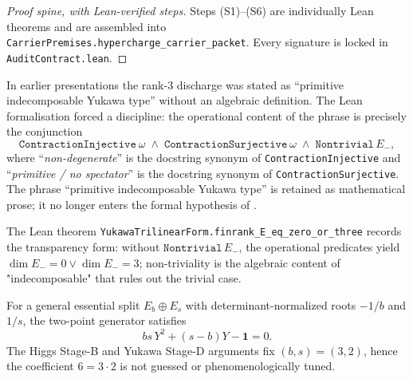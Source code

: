 \begin{proof}[Proof spine, with Lean-verified steps]
Steps (S1)--(S6) are individually Lean theorems and are
assembled into \texttt{CarrierPremises.hypercharge\_carrier\_packet}.
Every signature is locked in
\texttt{AuditContract.lean}.\qedhere
\end{proof}

\begin{remark}
\label{rem:primitive-yukawa-naming}
In earlier presentations the rank-$3$ discharge was stated as
``primitive indecomposable Yukawa type'' without an algebraic
definition. The Lean formalisation forced a discipline: the
operational content of the phrase is precisely the conjunction
\[
\texttt{ContractionInjective}\ \omega
\;\wedge\;
\texttt{ContractionSurjective}\ \omega
\;\wedge\;
\texttt{Nontrivial}\,E_-,
\]
where ``\emph{non-degenerate}'' is the docstring synonym of
\texttt{ContractionInjective} and ``\emph{primitive / no
spectator}'' is the docstring synonym of
\texttt{ContractionSurjective}. The phrase
``primitive indecomposable Yukawa type'' is retained as
mathematical prose; it no longer enters the formal hypothesis
of .

The Lean theorem
\texttt{YukawaTrilinearForm.finrank\_E\_eq\_zero\_or\_three}
records the transparency form: without
$\texttt{Nontrivial}\,E_-$, the operational predicates yield
$\dim E_- = 0 \vee \dim E_- = 3$; non-triviality is the
algebraic content of "indecomposable" that rules out the
trivial case.
\end{remark}

\begin{remark}
For a general essential split $E_b\oplus E_s$ with determinant-normalized roots
$-1/b$ and $1/s$, the two-point generator satisfies
\[
bs\,Y^2+(s-b)Y-\mathbf 1=0.
\]
The Higgs Stage-B and Yukawa Stage-D arguments fix $(b,s)=(3,2)$, hence the coefficient
$6=3\cdot2$ is not guessed or phenomenologically tuned.
\end{remark}

